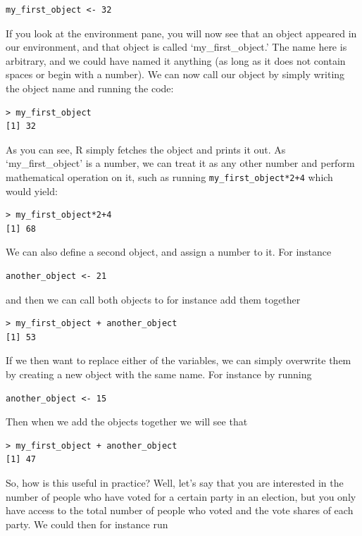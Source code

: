 \documentclass[
]{book}
\begin{document}
\begin{verbatim}
my_first_object <- 32
\end{verbatim}

If you look at the environment pane, you will now see that an object appeared in our environment, and that object is called `my\_first\_object.' The name here is arbitrary, and we could have named it anything (as long as it does not contain spaces or begin with a number). We can now call our object by simply writing the object name and running the code:

\begin{verbatim}
> my_first_object
[1] 32
\end{verbatim}

As you can see, R simply fetches the object and prints it out. As `my\_first\_object' is a number, we can treat it as any other number and perform mathematical operation on it, such as running \texttt{my\_first\_object*2+4} which would yield:

\begin{verbatim}
> my_first_object*2+4
[1] 68
\end{verbatim}

We can also define a second object, and assign a number to it. For instance

\begin{verbatim}
another_object <- 21
\end{verbatim}

and then we can call both objects to for instance add them together

\begin{verbatim}
> my_first_object + another_object
[1] 53
\end{verbatim}

If we then want to replace either of the variables, we can simply overwrite them by creating a new object with the same name. For instance by running

\begin{verbatim}
another_object <- 15
\end{verbatim}

Then when we add the objects together we will see that

\begin{verbatim}
> my_first_object + another_object
[1] 47
\end{verbatim}

So, how is this useful in practice? Well, let's say that you are interested in the number of people who have voted for a certain party in an election, but you only have access to the total number of people who voted and the vote shares of each party. We could then for instance run
\end{document}
